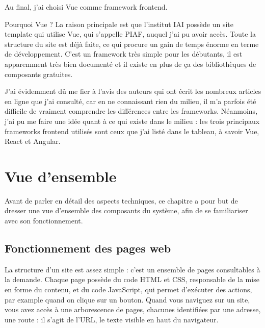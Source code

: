 \documentclass[
    iai, %
    eai, %
]{heig-tb}
\begin{document}

Au final, j'ai choisi Vue comme framework frontend.

Pourquoi Vue ? La raison principale est que l'institut IAI possède un site template qui utilise Vue, qui s'appelle PIAF, auquel j'ai pu avoir accès.
Toute la structure du site est déjà faite, ce qui procure un gain de temps énorme en terme de développement.
C'est un framework très simple pour les débutants, il est apparemment très bien documenté et il existe en plus de ça des bibliothèques de composants gratuites.

J'ai évidemment dû me fier à l'avis des auteurs qui ont écrit les nombreux articles en ligne que j'ai consulté, car en ne connaissant rien du milieu, il m'a parfois été difficile de vraiment comprendre les différences entre les frameworks.
Néanmoins, j'ai pu me faire une idée quant à ce qui existe dans le milieu : les trois principaux frameworks frontend utilisés sont ceux que j'ai listé dans le tableau, à savoir Vue, React et Angular.


\chapter{Vue d'ensemble}
Avant de parler en détail des aspects techniques, ce chapitre a pour but de dresser une vue d'ensemble des composants du système, afin de se familiariser avec son fonctionnement.

\section{Fonctionnement des pages web}
La structure d'un site est assez simple : c'est un ensemble de pages consultables à la demande. Chaque page possède du code HTML et CSS, responsable de la mise en forme du contenu, et du code JavaScript, qui permet d'exécuter des actions, par example quand on clique sur un bouton.
Quand vous naviguez sur un site, vous avez accès à une arborescence de pages, chacunes identifiées par une adresse, une route : il s'agit de l'URL, le texte visible en haut du navigateur.
\end{document}
